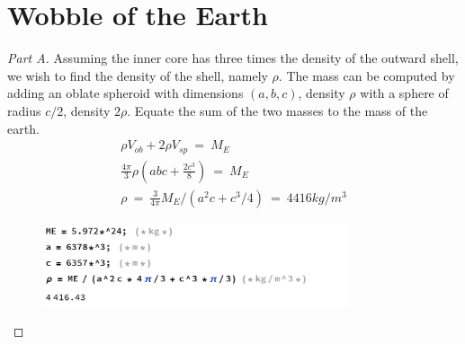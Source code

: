 \documentclass{article}
\numberwithin{equation}{section}
\begin{document}
\section{Wobble of the Earth}
\begin{proof}[Part A] 
    Assuming the inner core has three times the density of the 
    outward shell, we wish to find the density of the shell, namely $\rho$. 
    The mass can be computed by adding an oblate spheroid with dimensions 
    $(a, b, c)$, density $\rho$ with a sphere of radius $c/2$, density $2\rho$. 
    Equate the sum of the two masses to the mass of the earth. 
    \begin{align}
        \rho V_{ob} + 2\rho V_{sp} \ = \ M_E \\ 
        \frac {4\pi} 3 \rho \left(
            abc + \frac {2 c^3} 8 
        \right)  \ = \ 
        M_E \\ 
        \rho \ = \ \frac 3 {4\pi}M_E \bigg/ \left(
            a^2 c + c^3/4 
        \right)\ = \ \boxed{ 4416 kg/m^3}
    \end{align}
    \begin{figure}[h]
        \centering
        \includegraphics[width=0.8\textwidth]{Q5_a.png} %
        \label{fig:example}
    \end{figure}
    
\end{proof}
\end{document}
